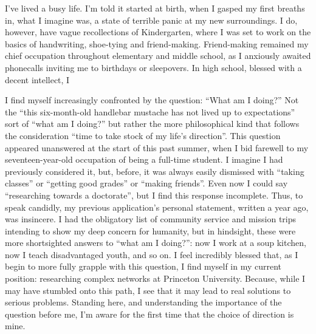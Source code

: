 I've lived a busy life. I'm told it started at birth, when I gasped my first breaths in, what I imagine was, a state of terrible panic at my new surroundings. I do, however, have vague recollections of Kindergarten, where I was set to work on the basics of handwriting, shoe-tying and friend-making. Friend-making remained my chief occupation throughout elementary and middle school, as I anxiously awaited phonecalls inviting me to birthdays or sleepovers. In high school, blessed with a decent intellect, I 

I find myself increasingly confronted by the question: ``What am I doing?'' Not the ``this six-month-old handlebar mustache has not lived up to expectations'' sort of  ``what am I doing?'' but rather the more philosophical kind that follows the consideration ``time to take stock of my life's direction''. This question appeared unanswered at the start of this past summer, when I bid farewell to my seventeen-year-old occupation of being a full-time student. I imagine I had previously considered it, but, before, it was always easily dismissed with ``taking classes'' or ``getting good grades'' or ``making friends''. Even now I could say ``researching towards a doctorate'', but I find this response incomplete. Thus, to speak candidly, my previous application's personal statement, written a year ago, was insincere. I had the obligatory list of community service and mission trips intending to show my deep concern for humanity, but in hindsight, these were more shortsighted answers to ``what am I doing?'': now I work at a soup kitchen, now I teach disadvantaged youth, and so on. I feel incredibly blessed that, as I begin to more fully grapple with this question, I find myself in my current position: researching complex networks at Princeton University. Because, while I may have stumbled onto this path, I see that it may lead to real solutions to serious problems. Standing here, and understanding the importance of the question before me, I'm aware for the first time that the choice of direction is mine.
